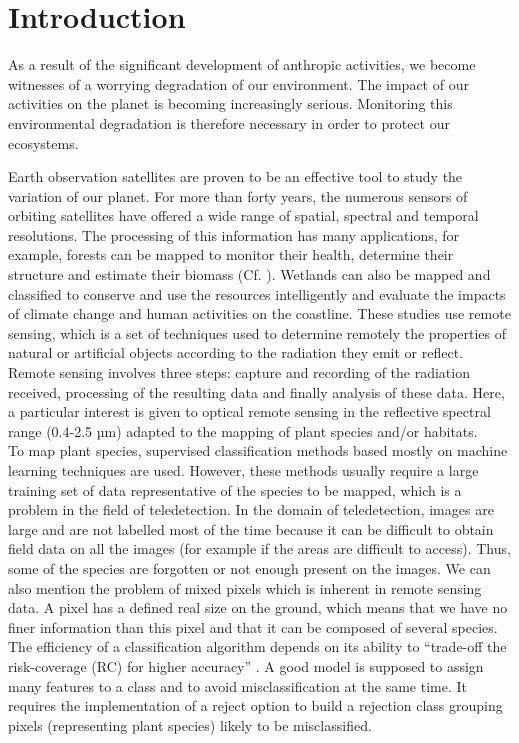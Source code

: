 \documentclass{siamart171218}
\begin{document}
\section{Introduction}

As a result of the significant development of anthropic activities, we become witnesses of a worrying degradation of our environment. The impact of our activities on the planet is becoming increasingly serious. Monitoring this environmental degradation is therefore necessary in order to protect our ecosystems.

Earth observation satellites are proven to be an effective tool to study the variation of our planet. For more than forty years, the numerous sensors of  orbiting satellites have offered a wide range of spatial, spectral and temporal resolutions. The processing of this information has many applications, for example, forests can be mapped to monitor their health, determine their structure and estimate their biomass (Cf. \cite{Loureno2021BiomassEU}). Wetlands can also be mapped and classified to conserve and use the resources intelligently and evaluate the impacts of climate change and human activities on the coastline. These studies use remote sensing, which is a set of techniques used to determine remotely the properties of natural or artificial objects according to the radiation they emit or reflect. Remote sensing involves three steps: capture and recording of the radiation received, processing of the resulting data and finally analysis of these data. Here, a particular interest is given to optical remote sensing in the reflective spectral range (0.4-2.5 µm) adapted to the mapping of plant species and/or habitats. \\

To map plant species, supervised classification methods based mostly on machine learning techniques are used. However, these methods usually require a large training set of data representative of the species to be mapped, which is a problem in the field of teledetection. In the domain of teledetection, images are large and are not labelled most of the time because it can be difficult to obtain field data on all the images (for example if the areas are difficult to access). Thus, some of the species are forgotten or not enough present on the images. We can also mention the problem of mixed pixels which is inherent in remote sensing data. A pixel has a defined real size on the ground, which means that we have no finer information than this pixel and that it can be composed of several species. The efficiency of a classification algorithm depends on its ability to “trade-off the risk-coverage (RC) for higher accuracy” \cite{ran2010Noise}. A good model is supposed to assign many  features to a class and to avoid misclassification at the same time. It requires the implementation of a reject option to build a rejection class grouping pixels (representing plant species) likely to be misclassified.
\end{document}
